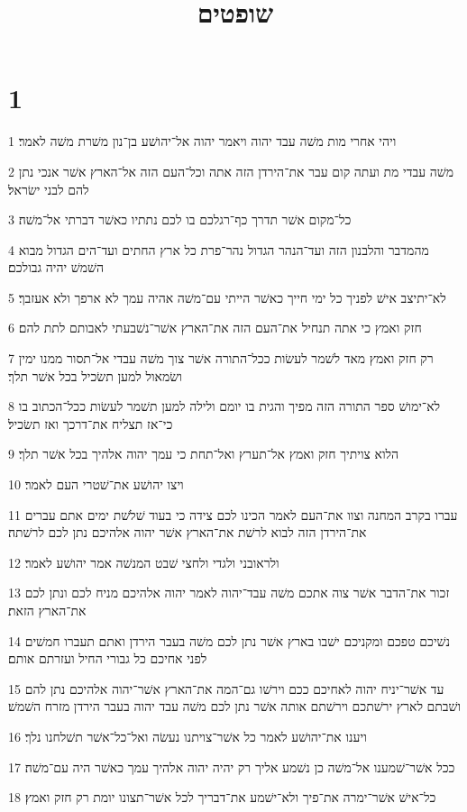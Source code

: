 

\title{שופטים}


\chapter{1}

\par 1 ויהי אחרי מות משׁה עבד יהוה ויאמר יהוה אל־יהושׁע בן־נון משׁרת משׁה לאמר׃
\par 2 משׁה עבדי מת ועתה קום עבר את־הירדן הזה אתה וכל־העם הזה אל־הארץ אשׁר אנכי נתן להם לבני ישׂראל׃
\par 3 כל־מקום אשׁר תדרך כף־רגלכם בו לכם נתתיו כאשׁר דברתי אל־משׁה׃
\par 4 מהמדבר והלבנון הזה ועד־הנהר הגדול נהר־פרת כל ארץ החתים ועד־הים הגדול מבוא השׁמשׁ יהיה גבולכם׃
\par 5 לא־יתיצב אישׁ לפניך כל ימי חייך כאשׁר הייתי עם־משׁה אהיה עמך לא ארפך ולא אעזבך׃
\par 6 חזק ואמץ כי אתה תנחיל את־העם הזה את־הארץ אשׁר־נשׁבעתי לאבותם לתת להם׃
\par 7 רק חזק ואמץ מאד לשׁמר לעשׂות ככל־התורה אשׁר צוך משׁה עבדי אל־תסור ממנו ימין ושׂמאול למען תשׂכיל בכל אשׁר תלך׃
\par 8 לא־ימושׁ ספר התורה הזה מפיך והגית בו יומם ולילה למען תשׁמר לעשׂות ככל־הכתוב בו כי־אז תצליח את־דרכך ואז תשׂכיל׃
\par 9 הלוא צויתיך חזק ואמץ אל־תערץ ואל־תחת כי עמך יהוה אלהיך בכל אשׁר תלך׃
\par 10 ויצו יהושׁע את־שׁטרי העם לאמר׃
\par 11 עברו בקרב המחנה וצוו את־העם לאמר הכינו לכם צידה כי בעוד שׁלשׁת ימים אתם עברים את־הירדן הזה לבוא לרשׁת את־הארץ אשׁר יהוה אלהיכם נתן לכם לרשׁתה׃
\par 12 ולראובני ולגדי ולחצי שׁבט המנשׁה אמר יהושׁע לאמר׃
\par 13 זכור את־הדבר אשׁר צוה אתכם משׁה עבד־יהוה לאמר יהוה אלהיכם מניח לכם ונתן לכם את־הארץ הזאת׃
\par 14 נשׁיכם טפכם ומקניכם ישׁבו בארץ אשׁר נתן לכם משׁה בעבר הירדן ואתם תעברו חמשׁים לפני אחיכם כל גבורי החיל ועזרתם אותם׃
\par 15 עד אשׁר־יניח יהוה לאחיכם ככם וירשׁו גם־המה את־הארץ אשׁר־יהוה אלהיכם נתן להם ושׁבתם לארץ ירשׁתכם וירשׁתם אותה אשׁר נתן לכם משׁה עבד יהוה בעבר הירדן מזרח השׁמשׁ׃
\par 16 ויענו את־יהושׁע לאמר כל אשׁר־צויתנו נעשׂה ואל־כל־אשׁר תשׁלחנו נלך׃
\par 17 ככל אשׁר־שׁמענו אל־משׁה כן נשׁמע אליך רק יהיה יהוה אלהיך עמך כאשׁר היה עם־משׁה׃
\par 18 כל־אישׁ אשׁר־ימרה את־פיך ולא־ישׁמע את־דבריך לכל אשׁר־תצונו יומת רק חזק ואמץ׃

